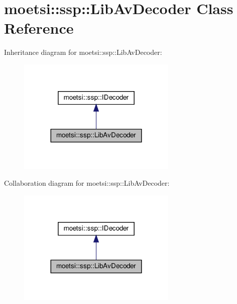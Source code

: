 \hypertarget{classmoetsi_1_1ssp_1_1LibAvDecoder}{}\section{moetsi\+:\+:ssp\+:\+:Lib\+Av\+Decoder Class Reference}
\label{classmoetsi_1_1ssp_1_1LibAvDecoder}


Inheritance diagram for moetsi\+:\+:ssp\+:\+:Lib\+Av\+Decoder\+:\nopagebreak
\begin{figure}[H]
\begin{center}
\leavevmode
\includegraphics[width=215pt]{classmoetsi_1_1ssp_1_1LibAvDecoder__inherit__graph}
\end{center}
\end{figure}


Collaboration diagram for moetsi\+:\+:ssp\+:\+:Lib\+Av\+Decoder\+:\nopagebreak
\begin{figure}[H]
\begin{center}
\leavevmode
\includegraphics[width=215pt]{classmoetsi_1_1ssp_1_1LibAvDecoder__coll__graph}
\end{center}
\end{figure}
